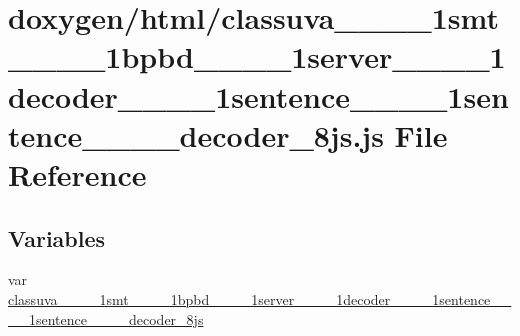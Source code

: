\hypertarget{classuva____1____1smt____1____1bpbd____1____1server____1____1decoder____1____1sentence____1____1cd42581cf0f7aa9daab3ccf8dcb308ff}{}\section{doxygen/html/classuva\+\_\+\+\_\+\_\+\+\_\+1smt\+\_\+\+\_\+\_\+\+\_\+1bpbd\+\_\+\+\_\+\_\+\+\_\+1server\+\_\+\+\_\+\_\+\+\_\+1decoder\+\_\+\+\_\+\_\+\+\_\+1sentence\+\_\+\+\_\+\_\+\+\_\+1sentence\+\_\+\+\_\+\+\_\+\+\_\+decoder\+\_\+8js.js File Reference}
\label{classuva____1____1smt____1____1bpbd____1____1server____1____1decoder____1____1sentence____1____1cd42581cf0f7aa9daab3ccf8dcb308ff}
\subsection*{Variables}
\begin{DoxyCompactItemize}
\item 
var \hyperlink{classuva____1____1smt____1____1bpbd____1____1server____1____1decoder____1____1sentence____1____1cd42581cf0f7aa9daab3ccf8dcb308ff_af025e6e0f4d4167634ca23335d0771da}{classuva\+\_\+\+\_\+\_\+\+\_\+1smt\+\_\+\+\_\+\_\+\+\_\+1bpbd\+\_\+\+\_\+\_\+\+\_\+1server\+\_\+\+\_\+\_\+\+\_\+1decoder\+\_\+\+\_\+\_\+\+\_\+1sentence\+\_\+\+\_\+\_\+\+\_\+1sentence\+\_\+\+\_\+\+\_\+\+\_\+decoder\+\_\+8js}
\end{DoxyCompactItemize}



